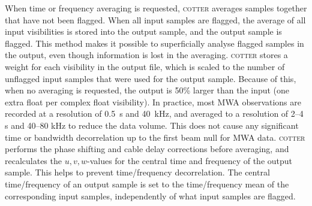 \documentclass{pasa}
\begin{document}
When time or frequency averaging is requested, \textsc{cotter} averages samples together that have not been flagged. When all input samples are flagged, the average of all input visibilities is stored into the output sample, and the output sample is flagged. This method makes it possible to superficially analyse flagged samples in the output, even though information is lost in the averaging. \textsc{cotter} stores a weight for each visibility in the output file, which is scaled to the number of unflagged input samples that were used for the output sample. Because of this, when no averaging is requested, the output is 50\% larger than the input (one extra float per complex float visibility). In practice, most MWA observations are recorded at a resolution of 0.5~s and 40~kHz, and averaged to a resolution of 2--4 s and 40--80 kHz to reduce the data volume. This does not cause any significant time or bandwidth decorrelation up to the first beam null for MWA data. \textsc{cotter} performs the phase shifting and cable delay corrections before averaging, and recalculates the $u,v,w$-values for the central time and frequency of the output sample. This helps to prevent time/frequency decorrelation. The central time/frequency of an output sample is set to the time/frequency mean of the corresponding input samples, independently of what input samples are flagged.
\end{document}
